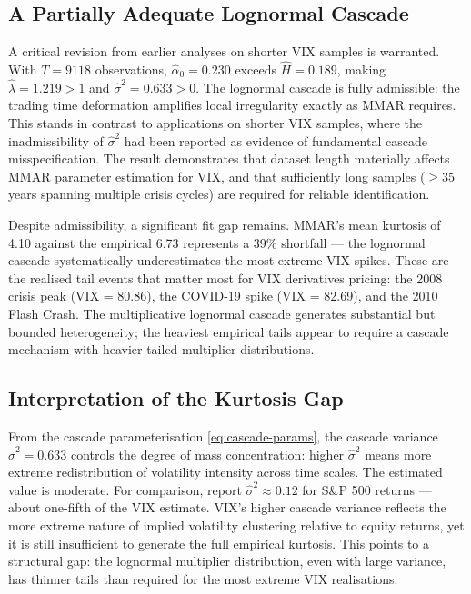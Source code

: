 \documentclass[12pt,a4paper]{article}
\begin{document}
\subsection{A Partially Adequate Lognormal Cascade}

A critical revision from earlier analyses on shorter VIX samples
is warranted. With $T = 9118$ observations, $\hat{\alpha}_0 = 0.230$
exceeds $\hat{H} = 0.189$, making $\hat{\lambda} = 1.219 > 1$ and
$\hat{\sigma}^2 = 0.633 > 0$. The lognormal cascade is fully
admissible: the trading time deformation amplifies local irregularity
exactly as MMAR requires. This stands in contrast to applications
on shorter VIX samples, where the inadmissibility of $\hat{\sigma}^2$
had been reported as evidence of fundamental cascade misspecification.
The result demonstrates that dataset length materially affects MMAR
parameter estimation for VIX, and that sufficiently long samples
($\geq 35$ years spanning multiple crisis cycles) are required for
reliable identification.

Despite admissibility, a significant fit gap remains. MMAR's mean
kurtosis of 4.10 against the empirical 6.73 represents a 39\% shortfall
--- the lognormal cascade systematically underestimates the most
extreme VIX spikes. These are the realised tail events that matter most
for VIX derivatives pricing: the 2008 crisis peak (VIX = 80.86), the
COVID-19 spike (VIX = 82.69), and the 2010 Flash Crash. The
multiplicative lognormal cascade generates substantial but bounded
heterogeneity; the heaviest empirical tails appear to require a cascade
mechanism with heavier-tailed multiplier distributions.

\subsection{Interpretation of the Kurtosis Gap}

From the cascade parameterisation \eqref{eq:cascade-params}, the
cascade variance $\hat{\sigma}^2 = 0.633$ controls the degree of mass
concentration: higher $\hat{\sigma}^2$ means more extreme redistribution
of volatility intensity across time scales. The estimated value is
moderate. For comparison, \citet{calvetfisher2002} report
$\hat{\sigma}^2 \approx 0.12$ for S\&P 500 returns --- about one-fifth
of the VIX estimate. VIX's higher cascade variance reflects the more
extreme nature of implied volatility clustering relative to equity
returns, yet it is still insufficient to generate the full empirical
kurtosis. This points to a structural gap: the lognormal multiplier
distribution, even with large variance, has thinner tails than required
for the most extreme VIX realisations.
\end{document}
